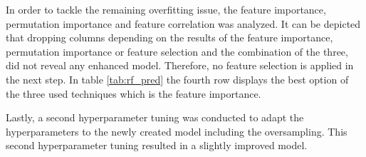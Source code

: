 In order to tackle the remaining overfitting issue, the feature importance, permutation importance and feature correlation was analyzed. \citep{Piotri2020} It can be depicted that dropping columns depending on the results of the feature importance, permutation importance or feature selection and the combination of the three, did not reveal any enhanced model. Therefore, no feature selection is applied in the next step. In table \ref{tab:rf_pred} the fourth row displays the best option of the three used techniques which is the feature importance.

Lastly, a second hyperparameter tuning was conducted to adapt the hyperparameters to the newly created model including the oversampling. This second hyperparameter tuning resulted in a slightly improved model.






